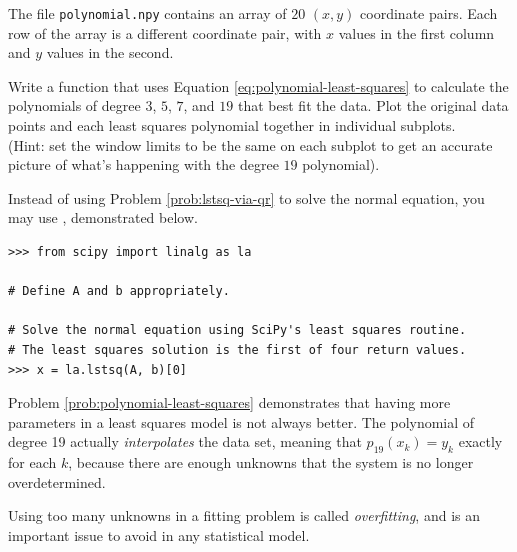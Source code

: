 \begin{problem} %
The file \texttt{polynomial.npy} contains an array of $20$ $(x,y)$ coordinate pairs.
Each row of the array is a different coordinate pair, with $x$ values in the first column and $y$ values in the second.

Write a function that uses Equation \ref{eq:polynomial-least-squares} to calculate the polynomials of degree $3$, $5$, $7$, and $19$ that best fit the data.
Plot the original data points and each least squares polynomial together in individual subplots.\\
(Hint: set the window limits to be the same on each subplot to get an accurate picture of what's happening with the degree $19$ polynomial).

Instead of using Problem \ref{prob:lstsq-via-qr} to solve the normal equation, you may use , demonstrated below.

\begin{lstlisting}
>>> from scipy import linalg as la

# Define A and b appropriately.

# Solve the normal equation using SciPy's least squares routine.
# The least squares solution is the first of four return values.
>>> x = la.lstsq(A, b)[0]
\end{lstlisting}

\label{prob:polynomial-least-squares}
\end{problem}

\begin{warn} %
Problem \ref{prob:polynomial-least-squares} demonstrates that having more parameters in a least squares model is not always better.
The polynomial of degree 19 actually \emph{interpolates} the data set, meaning that $p_{19}(x_k) = y_k$ exactly for each $k$, because there are enough unknowns that the system is no longer overdetermined.

Using too many unknowns in a fitting problem is called \emph{overfitting}, and is an important issue to avoid in any statistical model.
\end{warn}


